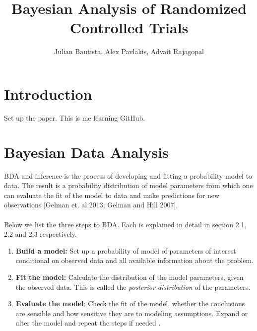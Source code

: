 \documentclass[12pt, oneside]{article}
\title{Bayesian Analysis of Randomized Controlled Trials}
\author{Julian Bautista, Alex Pavlakis, Advait Rajagopal}
\begin{document}
\maketitle

\abstract{}	

\newpage 

\tableofcontents
\newpage

\section{Introduction}
Set up the paper. This is me learning GitHub.

\section{Bayesian Data Analysis}
BDA and inference is the process of developing and fitting a probability model to data. The result is a probability distribution of model parameters from which one can evaluate the fit of the model to  data and make predictions for new observations [Gelman et. al 2013; Gelman and Hill 2007].\\
\\
Below we list the three steps to BDA.  Each is explained in detail in section 2.1, 2.2 and 2.3 respectively.
\begin{enumerate}
\item{\textbf{Build a model:} Set up a probability of model of parameters of interest conditional on observed data and all available information about the problem.}
\item{\textbf{Fit the model:} Calculate the distribution of the model parameters, given the observed data. This is called the \textit{posterior distribution} of the parameters.}
\item{\textbf{Evaluate the model}: Check the fit of the model, whether the conclusions are sensible and how sensitive they are to modeling assumptions. Expand or alter the model and repeat the steps if needed .}
\end{enumerate}
\end{document}
